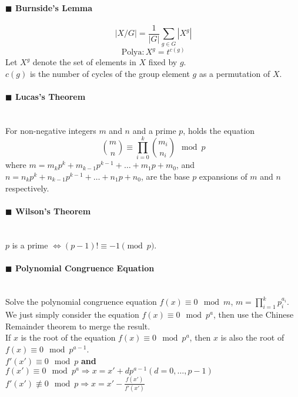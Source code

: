 \documentclass[10pt]{article}
\begin{document}
\paragraph{$\blacksquare$ Burnside's Lemma}
\noindent
\begin{displaymath}
  |X/G|=\frac{1}{|G|}\sum_{g\in G}|X^g|
\end{displaymath}
\begin{displaymath}
  \mathrm{Polya}: X^g=t^{c(g)}
\end{displaymath}
Let $X^g$ denote the set of elements in $X$ fixed by $g$. \\
$c(g)$ is the number of cycles of the group element $g$ as a permutation of $X$.
\paragraph{$\blacksquare$ Lucas's Theorem}
\noindent \\
For non-negative integers $m$ and $n$ and a prime $p$, holds the equation \\
\begin{displaymath}
  \binom{m}{n} \equiv \prod_{i=0}^k \binom{m_i}{n_i} \mod p
\end{displaymath}
where $m=m_kp^k+m_{k-1}p^{k-1}+\ldots +m_1p+m_0$, and $n=n_kp^k+n_{k-1}p^{k-1}+\ldots +n_1p+n_0$, are the base $p$ expansions of $m$ and $n$ respectively.
\paragraph{$\blacksquare$ Wilson's Theorem}
\noindent \\
$p$ is a prime $\iff (p-1)! \equiv -1 \pmod{p}$.
\paragraph{$\blacksquare$ Polynomial Congruence Equation}
\noindent \\
Solve the polynomial congruence equation $f(x)\equiv 0 \mod m$, $m=\prod_{i=1}^{k}p_i^{a_i}$. \\
We just simply consider the equation $f(x)\equiv 0 \mod p^a$, then use the Chinese Remainder theorem to merge the result. \\
If $x$ is the root of the equation $f(x)\equiv 0 \mod p^a$, then $x$ is also the root of $f(x)\equiv 0 \mod p^{a-1}$. \\
$f'(x')\equiv 0 \mod p$ \textbf{and} $f(x')\equiv 0 \mod p^a \Rightarrow x=x'+dp^{a-1}(d=0,\ldots ,p-1)$ \\
$f'(x')\not\equiv 0 \mod p \Rightarrow x=x'-\frac{f(x')}{f'(x')}$
\end{document}
